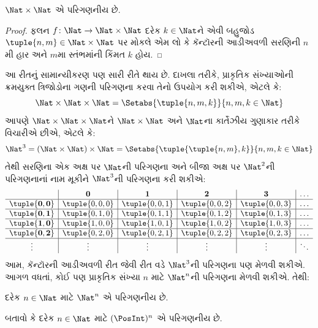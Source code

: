 \begin{prop}
$\Nat \times \Nat$ એ પરિગણનીય છે.
\end{prop}

\begin{proof}
ફલન $f \colon \Nat \to \Nat\times\Nat$ દરેક
$k \in \Nat$ને એવી બહુજોડ
$\tuple{n,m} \in \Nat \times \Nat$ પર મોકલે એમ લો
કે કૅન્ટૉરની આડીઅવળી સરણિની $n$મી હાર અને
$m$મા સ્તંભમાંની કિંમત $k$ હોય.
\end{proof}

\begin{explain}
આ રીતનું સામાન્યીકરણ પણ સારી રીતે થાય છે. દાખલા તરીકે,
પ્રાકૃતિક સંખ્યાઓની ક્રમયુક્ત ત્રિજોડોના ગણની પરિગણના
કરવા તેનો ઉપયોગ કરી શકીએ, એટલે કે:
\[
\Nat \times \Nat \times \Nat = \Setabs{\tuple{n,m,k}}{n,m,k \in \Nat}
\]
આપણે $\Nat \times \Nat \times \Nat$ને
$\Nat \times \Nat$ અને $\Nat$ના કાર્તેઝીય ગુણાકાર
તરીકે વિચારીએ છીએ, એટલે કે:
\[
\Nat^3 = (\Nat \times \Nat) \times \Nat =
\Setabs{\tuple{\tuple{n,m},k}}{n, m, k
  \in \Nat }
\]
તેથી સરણિના એક અક્ષ પર $\Nat$ની પરિગણના
અને બીજા અક્ષ પર $\Nat^2$ની પરિગણનાનાં નામ
મૂકીને $\Nat^3$ની પરિગણના કરી શકીએ:
\[
\begin{array}{ c | c | c | c | c | c}
& \mathbf 0 & \mathbf 1 & \mathbf 2 & \mathbf 3 & \dots \\
\hline
\mathbf{\tuple{0,0}} & \tuple{0,0,0} & \tuple{0,0,1} & \tuple{0,0,2} & \tuple{0,0,3} & \dots \\
\hline
\mathbf{\tuple{0,1}} & \tuple{0,1,0} & \tuple{0,1,1} & \tuple{0,1,2} & \tuple{0,1,3} & \dots \\
\hline
\mathbf{\tuple{1,0}} & \tuple{1,0,0} & \tuple{1,0,1} & \tuple{1,0,2} & \tuple{1,0,3} & \dots \\
\hline
\mathbf{\tuple{0,2}} & \tuple{0,2,0} & \tuple{0,2,1} & \tuple{0,2,2} & \tuple{0,2,3} & \dots\\
\hline
\vdots & \vdots & \vdots & \vdots & \vdots & \ddots \\
\end{array}
\]
આમ, કૅન્ટૉરની આડીઅવળી રીત જેવી રીત વડે
$\Nat^3$ની પરિગણના પણ મેળવી શકીએ.
આગળ વધતાં, કોઈ પણ પ્રાકૃતિક સંખ્યા $n$ માટે
$\Nat^n$ની પરિગણના મેળવી શકીએ. તેથી:
\end{explain}

\begin{prop}
દરેક $n \in \Nat$ માટે $\Nat^n$ એ પરિગણનીય છે.
\end{prop}

\begin{prob}\label{sfr:siz:zigzag:prob:posint-n}
બતાવો કે દરેક $n \in \Nat$ માટે $(\PosInt)^n$
એ પરિગણનીય છે.
\end{prob}


